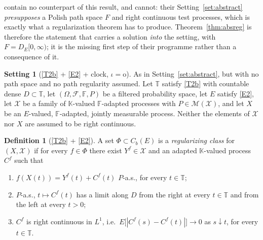 \documentclass[11pt,a4paper]{article}
\theoremstyle{plain}
\theoremstyle{definition}
\newtheorem{definition}[theorem]{Definition}
\newtheorem{setting}[theorem]{Setting}
\theoremstyle{remark}
\newcommand{\T}{\mathbb{T}}                     %
\newcommand{\Cb}{C_b}                          %
\newcommand{\DE}{D_E[0,\infty)}
\newcommand{\Filt}{\mathcal{F}}
\newcommand{\K}{\mathbb{K}}
\newcommand{\XX}{\mathcal{X}}                  %
\newcommand{\Msol}{\mathcal{M}}
\newcommand{\CPS}{\cite{CPS23}}
\begin{document}
\CPS{} contain no counterpart of this result, and cannot: their
Setting~\ref{set:abstract} \emph{presupposes} a Polish path space $F$ and right
continuous test processes, which is exactly what a regularization theorem has to
produce.  Theorem~\ref{thm:absreg} is therefore the statement that carries a
solution \emph{into} the \CPS{} setting, with $F = \DE$; it is the missing first
step of their programme rather than a consequence of it.

\begin{setting}[\eqref{T2b} + \eqref{E2} + clock, $\iota = \mathrm{o}$]
  \label{set:absreg}
  As in Setting~\ref{set:abstract}, but with no path space and no path
  regularity assumed.  Let $\T$ satisfy \eqref{T2b} with countable dense $D \subset \T$,
  let $(\Omega,\Filt,\mathbb{F},P)$ be a filtered probability space, let $E$
  satisfy \eqref{E2}, let $\XX$ be a family of $\K$-valued $\mathbb{F}$-adapted processes
  with $P \in \Msol(\XX)$, and let $X$ be an $E$-valued, $\mathbb{F}$-adapted,
  jointly measurable process.  Neither the elements of $\XX$ nor $X$ are assumed
  to be right continuous.
\end{setting}

\begin{definition}[\eqref{T2b} + \eqref{E2}]
  \label{def:regclass}
  A set $\Phi \subset \Cb(E)$ is a \emph{regularizing class} for $(X,\XX)$ if for
  every $f \in \Phi$ there exist $Y^f \in \XX$ and an adapted $\K$-valued process
  $C^f$ such that
  \begin{enumerate}[label=(R\arabic*)]
  \item \label{it:R1}
    $f(X(t)) = Y^f(t) + C^f(t)$ $P$-a.s., for every $t \in \T$;
  \item \label{it:R2}
    $P$-a.s., $t \mapsto C^f(t)$ has a limit along $D$ from the right at every
    $t \in \T$ and from the left at every $t > 0$;
  \item \label{it:R3}
    $C^f$ is right continuous in $L^1$, i.e.\
    $E\bigl[ |C^f(s) - C^f(t)| \bigr] \to 0$ as $s \downarrow t$, for every
    $t \in \T$.
  \end{enumerate}
\end{definition}
\end{document}
